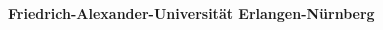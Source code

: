 \date{}

\begin{titlepage}
\begin{localsize}{11} %
\thispagestyle{empty}
\begin{center}
 

\vspace*{-2cm}
\begin{center}
\vspace{0pt}\sffamily{} 
{\Large{ \textbf {Friedrich-Alexander-Universit\"at Erlangen-N\"urnberg}} }


\end{center}
\end{center}
\end{localsize}
\end{titlepage}
